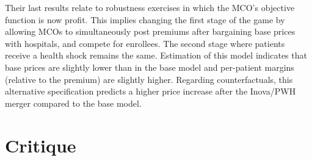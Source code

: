 \documentclass[12pt,english]{article}
\begin{document}
Their last results relate to robustness exercises in which the MCO's objective function is now profit. This implies changing the first stage of the game by allowing MCOs to simultaneously post premiums after bargaining base prices with hospitals, and compete for enrollees. The second stage where patients receive a health shock remains the same. Estimation of this model indicates that base prices are slightly lower than in the base model and per-patient margins (relative to the premium) are slightly higher. Regarding counterfactuals, this alternative specification predicts a higher price increase after the Inova/PWH merger compared to the base model.

\section{Critique}
\end{document}
